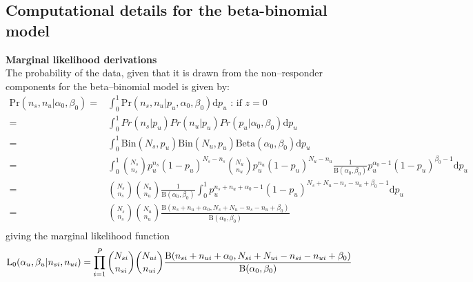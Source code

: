 \documentclass{article}
\begin{document}
\subsection{Computational details for the beta-binomial model}
\noindent\textbf{Marginal likelihood derivations}\\
The probability of the data, given that it is drawn from the non--responder components for the beta--binomial model is given by:
\[
\begin{split}
\mathrm{Pr}(n_{s},n_{u}|\alpha_0,\beta_0) =&\int_0^1 \mathrm{Pr}(n_{s},n_{u}|p_u,\alpha_0,\beta_0)\mathrm{d}p_u  \text{ : if } z=0 \\
=& \int_0^1Pr(n_s|p_u)Pr(n_u|p_u)Pr(p_u|\alpha_0,\beta_0) \mathrm{d}p_u\\
=&\int_0^1 \mathrm{Bin}(N_s,p_u)\mathrm{Bin}(N_u,p_u)\mathrm{Beta}(\alpha_0,\beta_0 ) \mathrm{d}p_u\\
=&\int_0^1\binom{N_s}{n_s}p_u^{n_s}(1-p_u)^{N_s-n_s}\binom{N_u}{n_u}p_u^{n_u}(1-p_u)^{N_u-n_u}\frac{1}{\mathrm{B}(\alpha_0,\beta_0)}p_u^{\alpha_0-1}(1-p_u)^{\beta_0-1} \mathrm{d}p_u\\
=&\binom{N_s}{n_s}\binom{N_u}{n_u}\frac{1}{\mathrm{B}(\alpha_0,\beta_0)}\int_0^1 p_u^{n_s+n_u+\alpha_0-1}(1-p_u)^{N_s+N_u-n_s-n_u+\beta_0-1} \mathrm{d}p_u\\
=&\binom{N_s}{n_s}\binom{N_u}{n_u}\frac{\mathrm{B}(n_s+n_u+\alpha_0,N_s+N_u-n_s-n_u+\beta_0)}{\mathrm{B}(\alpha_0,\beta_0)}\\
\end{split}
\]
giving the marginal likelihood function
\[
\mathrm{L_0}(\alpha_u,\beta_u|n_{si},n_{ui}) = \prod_{i=1}^P\binom{N_{si}}{n_{si}}\binom{N_{ui}}{n_{ui}}\frac{\mathrm{B}(n_{si}+n_{ui}+\alpha_0,N_{si}+N_{ui}-n_{si}-n_{ui}+\beta_0)}{\mathrm{B}(\alpha_0,\beta_0)}\\
\]
\end{document}
